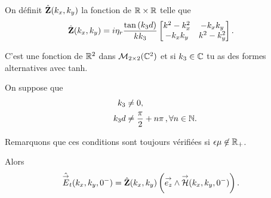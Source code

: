         \begin{defn}
          \label{def:plan:impedance:1c}
          On définit \(\hat {\mathbf{Z}}(k_x,k_y)\) la fonction de \(\mathbb R \times \mathbb R\) telle que
          \begin{align*}
            \hat {\mathbf{Z}}(k_x,k_y) &= i\eta_r\dfrac{\tan\left(k_3d\right)}{k k_3}
            \begin{bmatrix}
              k^2-k_x^2  & -k_xk_y
              \\
              -k_xk_y & k^2-k_y^2
            \end{bmatrix}.
          \end{align*}
        \end{defn}
        \begin{REM}
           C'est une fonction de \(\mathbb R^2\) dans \(\mathcal{M}_{2\times2}(\mathbb C^2)\) et si \(k_3\in\mathbb C\) tu as des formes alternatives avec tanh.
        \end{REM}
        \begin{prop}
            \label{prop:imp_plan:symb_z:1c}
            On suppose que
            \begin{align*}
                k_3     & \not = 0, \\
                k_3d    & \not = \dfrac{\pi}{2}+n\pi\,, \forall n \in \mathbb N.
            \end{align*}
            \begin{REM}
              Remarquons que ces conditions sont toujours vérifiées si \(\epsilon\mu\not\in\mathbb R_+\).
            \end{REM}
            Alors
            \begin{align*}
              \hat {{\overset{\rightarrow}{E}}}_t(k_x,k_y,0^-) &= \hat {\mathbf{Z}}(k_x,k_y) \left({\overset{\rightarrow}{e_z}} \wedge {\overset{\rightarrow}{\mathcal{H}}}(k_x,k_y,0^-)\right).
            \end{align*}
        \end{prop}

